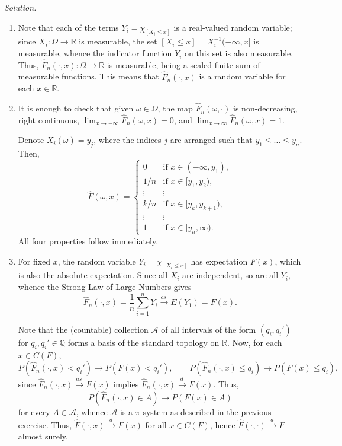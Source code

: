 \documentclass[10pt]{article}
\newcommand{\solution}{\textit{Solution.} }
\newcommand{\R}{\mathbb{R}}
\newcommand{\Q}{\mathbb{Q}}
\newcommand{\toas}{\overset{as\,}{\longrightarrow}}
\newcommand{\tod}{\overset{d\,}{\longrightarrow}}
\begin{document}
    \solution \begin{enumerate}
        \item Note that each of the terms $Y_i = \chi_{[X_i \leq x]}$ is a
        real-valued random variable; since $X_i\colon \Omega \to \R$ is measurable,
        the set $[X_i \leq x] = X_i^{-1}(-\infty, x]$ is measurable, whence the
        indicator function $Y_i$ on this set is also measurable. Thus,
        $\hat{F}_n(\cdot, x)\colon \Omega \to \R$ is measurable, being a scaled
        finite sum of measurable functions. This means that $\hat{F}_n(\cdot, x)$ is
        a random variable for each $x \in \R$.

        \item It is enough to check that given $\omega \in \Omega$, the map
        $\hat{F}_n(\omega, \cdot)$ is non-decreasing, right continuous,
        $\lim_{x \to -\infty} \hat{F}_n(\omega, x) = 0$, and $\lim_{x \to \infty}
        \hat{F}_n(\omega, x) = 1$.

        Denote $X_i(\omega) = y_j$, where the indices $j$ are arranged such that $y_1
        \leq \dots \leq y_n$. Then, \[
            \hat{F}(\omega, x) = \begin{cases}
                0 &\text{if } x \in (-\infty, y_1), \\
                1 / n &\text{if } x \in [y_1, y_2), \\
                \vdots &\vdots \\
                k / n &\text{if } x \in [y_k, y_{k + 1}), \\
                \vdots &\vdots \\
                1 &\text{if } x \in [y_n, \infty).
            \end{cases}
        \] All four properties follow immediately.

        \item For fixed $x$, the random variable $Y_i = \chi_{[X_i \leq x]}$ has
        expectation $F(x)$, which is also the absolute expectation. Since all $X_i$
        are independent, so are all $Y_i$, whence the Strong Law of Large Numbers
        gives \[
            \hat{F}_n(\cdot, x) = \frac{1}{n} \sum_{i = 1}^n Y_i \toas E(Y_1) = F(x).
        \]

        Note that the (countable) collection $\mathcal{A}$ of all intervals of the
        form $(q_i, q_i')$ for $q_i, q_i' \in \Q$ forms a basis of the standard
        topology on $\R$. Now, for each $x \in C(F)$, \[
            P(\hat{F}_n(\cdot, x) < q_i') \to P(F(x) < q_i'), \qquad
            P(\hat{F}_n(\cdot, x) \leq q_i) \to P(F(x) \leq q_i),
        \] since $\hat{F}_n(\cdot, x) \toas F(x)$ implies $\hat{F}_n(\cdot, x) \tod
        F(x)$. Thus, \[
            P(\hat{F}_n(\cdot, x) \in A) \to P(F(x) \in A)
        \] for every $A \in \mathcal{A}$, whence $\mathcal{A}$ is a $\pi$-system as
        described in the previous exercise. Thus, $\hat{F}(\cdot, x) \tod F(x)$ for
        all $x \in C(F)$, hence $\hat{F}(\cdot, \cdot) \tod F$ almost surely.

    \end{enumerate}
\end{document}
